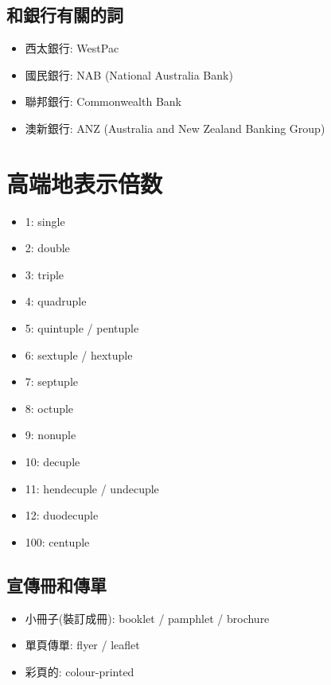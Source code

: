 \subsection{和銀行有關的詞}
\begin{itemize}
  \itemsep0em
  \item 西太銀行: WestPac
  \item 國民銀行: NAB (National Australia Bank)
  \item 聯邦銀行: Commonwealth Bank
  \item 澳新銀行: ANZ (Australia and New Zealand Banking Group)
\end{itemize}

\section{高端地表示倍数}
\begin{multicols}{3}
\begin{itemize}
  \itemsep0em
  \item 1: single
  \item 2: double
  \item 3: triple
  \item 4: quadruple
  \item 5: quintuple / pentuple
  \item 6: sextuple / hextuple
  \item 7: septuple
  \item 8: octuple
  \item 9: nonuple
  \item 10: decuple
  \item 11: hendecuple / undecuple
  \item 12: duodecuple
  \item 100: centuple
\end{itemize}
\end{multicols}

\subsection{宣傳冊和傳單}
\begin{itemize}
  \itemsep0em
  \item 小冊子(裝訂成冊): booklet / pamphlet / brochure
  \item 單頁傳單: flyer / leaflet
  \item 彩頁的: colour-printed
\end{itemize}

